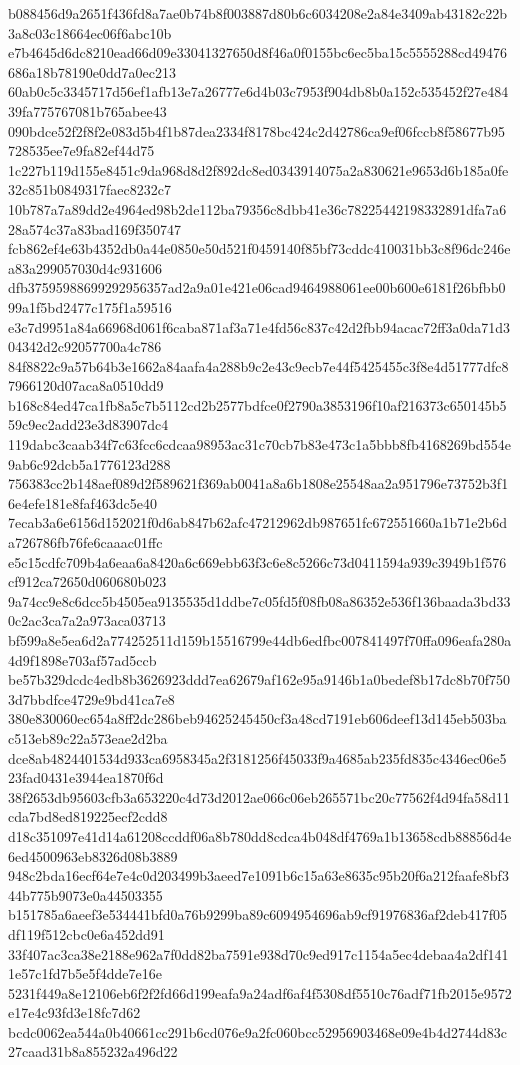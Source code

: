 {b088456d9a2651f436fd8a7ae0b74b8f003887d80b6c6034208e2a84e3409ab43182c22b3a8c03c18664ec06f6abc10b
e7b4645d6dc8210ead66d09e33041327650d8f46a0f0155bc6ec5ba15c5555288cd49476686a18b78190e0dd7a0ec213
60ab0c5c3345717d56ef1afb13e7a26777e6d4b03c7953f904db8b0a152c535452f27e48439fa775767081b765abee43
090bdce52f2f8f2e083d5b4f1b87dea2334f8178bc424c2d42786ca9ef06fccb8f58677b95728535ee7e9fa82ef44d75
1c227b119d155e8451c9da968d8d2f892dc8ed0343914075a2a830621e9653d6b185a0fe32c851b0849317faec8232c7
10b787a7a89dd2e4964ed98b2de112ba79356c8dbb41e36c78225442198332891dfa7a628a574c37a83bad169f350747
fcb862ef4e63b4352db0a44e0850e50d521f0459140f85bf73cddc410031bb3c8f96dc246ea83a299057030d4c931606
dfb37595988699292956357ad2a9a01e421e06cad9464988061ee00b600e6181f26bfbb099a1f5bd2477c175f1a59516
e3c7d9951a84a66968d061f6caba871af3a71e4fd56c837c42d2fbb94acac72ff3a0da71d304342d2c92057700a4c786
84f8822c9a57b64b3e1662a84aafa4a288b9c2e43c9ecb7e44f5425455c3f8e4d51777dfc87966120d07aca8a0510dd9
b168c84ed47ca1fb8a5c7b5112cd2b2577bdfce0f2790a3853196f10af216373c650145b559c9ec2add23e3d83907dc4
119dabc3caab34f7c63fcc6cdcaa98953ac31c70cb7b83e473c1a5bbb8fb4168269bd554e9ab6c92dcb5a1776123d288
756383cc2b148aef089d2f589621f369ab0041a8a6b1808e25548aa2a951796e73752b3f16e4efe181e8faf463dc5e40
7ecab3a6e6156d152021f0d6ab847b62afc47212962db987651fc672551660a1b71e2b6da726786fb76fe6caaac01ffc
e5c15cdfc709b4a6eaa6a8420a6c669ebb63f3c6e8c5266c73d0411594a939c3949b1f576cf912ca72650d060680b023
9a74cc9e8c6dcc5b4505ea9135535d1ddbe7c05fd5f08fb08a86352e536f136baada3bd330c2ac3ca7a2a973aca03713
bf599a8e5ea6d2a774252511d159b15516799e44db6edfbc007841497f70ffa096eafa280a4d9f1898e703af57ad5ccb
be57b329dcdc4edb8b3626923ddd7ea62679af162e95a9146b1a0bedef8b17dc8b70f7503d7bbdfce4729e9bd41ca7e8
380e830060ec654a8ff2dc286beb94625245450cf3a48cd7191eb606deef13d145eb503bac513eb89c22a573eae2d2ba
dce8ab4824401534d933ca6958345a2f3181256f45033f9a4685ab235fd835c4346ec06e523fad0431e3944ea1870f6d
38f2653db95603cfb3a653220c4d73d2012ae066c06eb265571bc20c77562f4d94fa58d11cda7bd8ed819225ecf2cdd8
d18c351097e41d14a61208ccddf06a8b780dd8cdca4b048df4769a1b13658cdb88856d4e6ed4500963eb8326d08b3889
948c2bda16ecf64e7e4c0d203499b3aeed7e1091b6c15a63e8635c95b20f6a212faafe8bf344b775b9073e0a44503355
b151785a6aeef3e534441bfd0a76b9299ba89c6094954696ab9cf91976836af2deb417f05df119f512cbc0e6a452dd91
33f407ac3ca38e2188e962a7f0dd82ba7591e938d70c9ed917c1154a5ec4debaa4a2df1411e57c1fd7b5e5f4dde7e16e
5231f449a8e12106eb6f2f2fd66d199eafa9a24adf6af4f5308df5510c76adf71fb2015e9572e17e4c93fd3e18fc7d62
bcdc0062ea544a0b40661cc291b6cd076e9a2fc060bcc52956903468e09e4b4d2744d83c27caad31b8a855232a496d22
}
